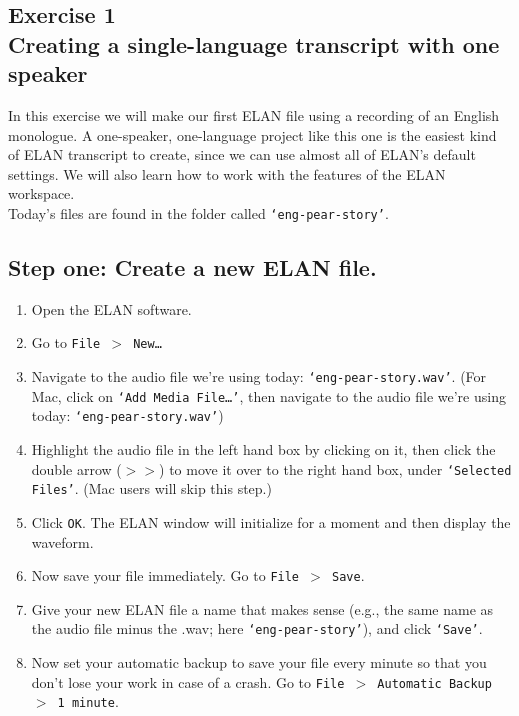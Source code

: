 \documentclass[letterpaper,12pt]{article}
\begin{document}
\begin{center}
\section*{Exercise 1\\Creating a single-language transcript with one speaker}
\end{center}

\noindent In this exercise we will make our first ELAN file using a recording of an English monologue. A one-speaker, one-language project like this one is the easiest kind of ELAN transcript to create, since we can use almost all of ELAN's default settings. We will also learn how to work with the features of the ELAN workspace.\\

\noindent Today's files are found in the folder called \texttt{`eng-pear-story'}.\\

\subsection*{Step one: Create a new ELAN file.}
\begin{enumerate}
\item Open the ELAN software.
\item Go to \texttt{File $>$ New\ldots}
\item Navigate to the audio file we're using today: \texttt{`eng-pear-story.wav'}. (For Mac, click on \texttt{`Add Media File\ldots'}, then navigate to the audio file we're using today: \texttt{`eng-pear-story.wav'})
\item Highlight the audio file in the left hand box by clicking on it, then click the double arrow ($>>$) to move it over to the right hand box, under \texttt{`Selected Files'}. (Mac users will skip this step.)
\item Click \texttt{OK}. The ELAN window will initialize for a moment and then display the waveform.
\item Now save your file immediately. Go to \texttt{File $>$ Save}.
\item Give your new ELAN file a name that makes sense (e.g., the same name as the audio file minus the .wav; here \texttt{`eng-pear-story'}), and click \texttt{`Save'}.
\item Now set your automatic backup to save your file every minute so that you don't lose your work in case of a crash. Go to \texttt{File $>$ Automatic Backup $>$ 1 minute}.
\end{enumerate}
\end{document}
